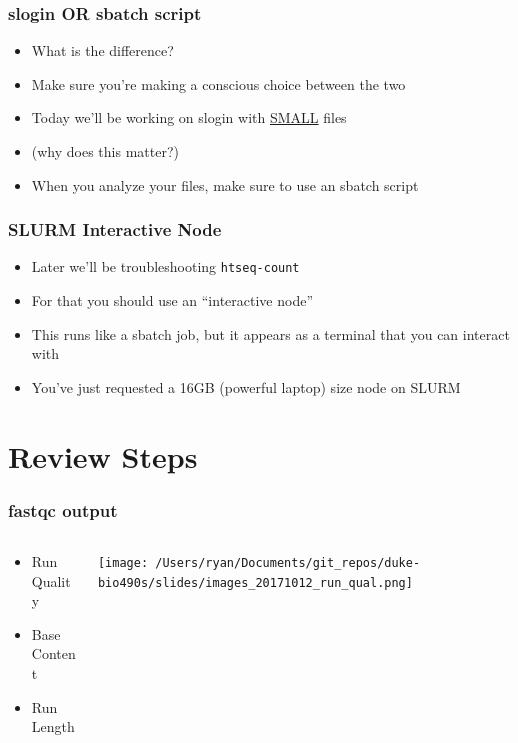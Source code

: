 \documentclass[14pt,handout]{beamer}
\begin{document}
\begin{frame}
\frametitle{slogin OR sbatch script}
\begin{itemize}
	\large
	\item<+-> What is the difference?
	\item<+-> Make sure you're making a conscious choice between the two
	\item<+-> Today we'll be working on slogin with \underline{SMALL} files
	\item<+-> (why does this matter?)
	\item<+-> When you analyze your files, make sure to use an sbatch script
\end{itemize}
\end{frame}

\begin{frame}
\frametitle{SLURM Interactive Node}
\begin{itemize}
	\item Later we'll be troubleshooting \texttt{htseq-count}
	\item For that you should use an ``interactive node''
	\item This runs like a sbatch job, but it appears as a terminal that you can interact with
	\footnotesize
	\ttfamily
	\sffamily
	\item You've just requested a 16GB (powerful laptop) size node on SLURM
\end{itemize}
\end{frame}

\section{Review Steps}

\begin{frame}
\frametitle{fastqc output}
\begin{columns}
	\begin{column}{0.35\textwidth}
		\begin{itemize}
			\item Run Quality
			\item Base Content
			\item Run Length
		\end{itemize}
		\end{column}
	\begin{column}{0.65\textwidth}
		\begin{center}
     		\texttt{[image: /Users/ryan/Documents/git\_repos/duke-bio490s/slides/images\_20171012\_run\_qual.png]}
     	\end{center}
	\end{column}
\end{columns}
\end{frame}
\end{document}
